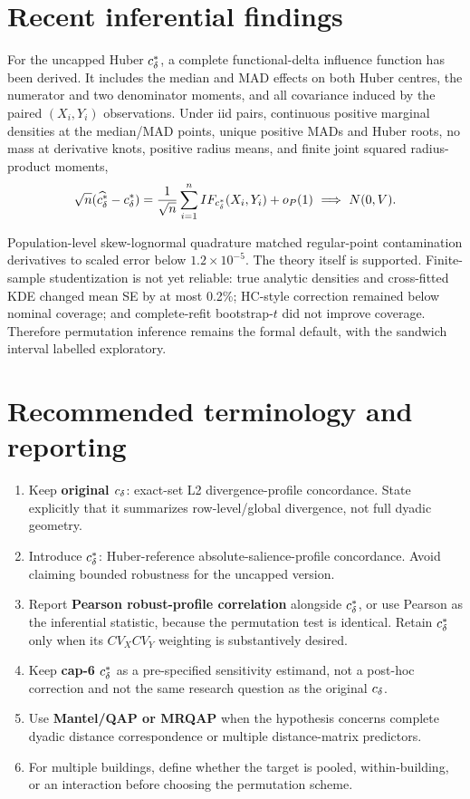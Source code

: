 \section{Recent inferential findings}

For the uncapped Huber $c_\delta^\ast$, a complete functional-delta influence function
has been derived. It includes the median and MAD effects on both Huber centres,
the numerator and two denominator moments, and all covariance induced by the
paired $(X_i,Y_i)$ observations. Under iid pairs, continuous positive marginal
densities at the median/MAD points, unique positive MADs and Huber roots, no
mass at derivative knots, positive radius means, and finite joint squared
radius-product moments,
\begin{equation}
\sqrt n(\widehat{c_\delta^\ast}-c_\delta^\ast)
=\frac{1}{\sqrt n}\sum_{i=1}^n IF_{c_\delta^\ast}(X_i,Y_i)+o_P(1)
\ \Longrightarrow\ N(0,V).
\end{equation}

Population-level skew-lognormal quadrature matched regular-point
contamination derivatives to scaled error below $1.2\times10^{-5}$. The
theory itself is supported. Finite-sample studentization is not yet reliable:
true analytic densities and cross-fitted KDE changed mean SE by at most 0.2\%;
HC-style correction remained below nominal coverage; and complete-refit
bootstrap-$t$ did not improve coverage. Therefore permutation inference
remains the formal default, with the sandwich interval labelled exploratory.

\section{Recommended terminology and reporting}

\begin{enumerate}
\item Keep \textbf{original $c_\delta$}: exact-set L2 divergence-profile
concordance. State explicitly that it summarizes row-level/global divergence,
not full dyadic geometry.
\item Introduce \textbf{$c_\delta^\ast$}: Huber-reference absolute-salience-profile
concordance. Avoid claiming bounded robustness for the uncapped version.
\item Report \textbf{Pearson robust-profile correlation} alongside $c_\delta^\ast$, or
use Pearson as the inferential statistic, because the permutation test is
identical. Retain $c_\delta^\ast$ only when its $CV_XCV_Y$ weighting is substantively
desired.
\item Keep \textbf{cap-6 $c_\delta^\ast$} as a pre-specified sensitivity estimand, not a
post-hoc correction and not the same research question as the original $c_\delta$.
\item Use \textbf{Mantel/QAP or MRQAP} when the hypothesis concerns complete
dyadic distance correspondence or multiple distance-matrix predictors.
\item For multiple buildings, define whether the target is pooled,
within-building, or an interaction before choosing the permutation scheme.
\end{enumerate}

